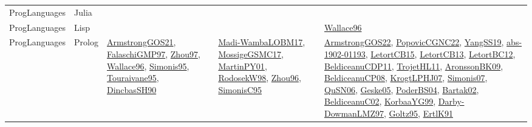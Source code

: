 {\begin{longtable}{lp{3cm}>{\raggedright}p{6cm}>{\raggedright}p{6cm}p{8cm}}
ProgLanguages & Julia &  &  & \\
ProgLanguages & Lisp &  &  & \href{articles/Wallace96.pdf}{Wallace96}\cite{Wallace96}\\
ProgLanguages & Prolog & \href{papers/ArmstrongGOS21.pdf}{ArmstrongGOS21}\cite{ArmstrongGOS21}, \href{articles/FalaschiGMP97.pdf}{FalaschiGMP97}\cite{FalaschiGMP97}, \href{articles/Zhou97.pdf}{Zhou97}\cite{Zhou97}, \href{articles/Wallace96.pdf}{Wallace96}\cite{Wallace96}, \href{papers/Simonis95.pdf}{Simonis95}\cite{Simonis95}, \href{papers/Touraivane95.pdf}{Touraivane95}\cite{Touraivane95}, \href{articles/DincbasSH90.pdf}{DincbasSH90}\cite{DincbasSH90} & \href{papers/Madi-WambaLOBM17.pdf}{Madi-WambaLOBM17}\cite{Madi-WambaLOBM17}, \href{papers/MossigeGSMC17.pdf}{MossigeGSMC17}\cite{MossigeGSMC17}, \href{articles/MartinPY01.pdf}{MartinPY01}\cite{MartinPY01}, \href{papers/RodosekW98.pdf}{RodosekW98}\cite{RodosekW98}, \href{papers/Zhou96.pdf}{Zhou96}\cite{Zhou96}, \href{papers/SimonisC95.pdf}{SimonisC95}\cite{SimonisC95} & \href{papers/ArmstrongGOS22.pdf}{ArmstrongGOS22}\cite{ArmstrongGOS22}, \href{papers/PopovicCGNC22.pdf}{PopovicCGNC22}\cite{PopovicCGNC22}, \href{papers/YangSS19.pdf}{YangSS19}\cite{YangSS19}, \href{articles/abs-1902-01193.pdf}{abs-1902-01193}\cite{abs-1902-01193}, \href{articles/LetortCB15.pdf}{LetortCB15}\cite{LetortCB15}, \href{papers/LetortCB13.pdf}{LetortCB13}\cite{LetortCB13}, \href{papers/LetortBC12.pdf}{LetortBC12}\cite{LetortBC12}, \href{articles/BeldiceanuCDP11.pdf}{BeldiceanuCDP11}\cite{BeldiceanuCDP11}, \href{articles/TrojetHL11.pdf}{TrojetHL11}\cite{TrojetHL11}, \href{papers/AronssonBK09.pdf}{AronssonBK09}\cite{AronssonBK09}, \href{papers/BeldiceanuCP08.pdf}{BeldiceanuCP08}\cite{BeldiceanuCP08}, \href{papers/KrogtLPHJ07.pdf}{KrogtLPHJ07}\cite{KrogtLPHJ07}, \href{articles/Simonis07.pdf}{Simonis07}\cite{Simonis07}, \href{papers/QuSN06.pdf}{QuSN06}\cite{QuSN06}, \href{papers/Geske05.pdf}{Geske05}\cite{Geske05}, \href{articles/PoderBS04.pdf}{PoderBS04}\cite{PoderBS04}, \href{papers/Bartak02.pdf}{Bartak02}\cite{Bartak02}, \href{papers/BeldiceanuC02.pdf}{BeldiceanuC02}\cite{BeldiceanuC02}, \href{papers/KorbaaYG99.pdf}{KorbaaYG99}\cite{KorbaaYG99}, \href{articles/Darby-DowmanLMZ97.pdf}{Darby-DowmanLMZ97}\cite{Darby-DowmanLMZ97}, \href{papers/Goltz95.pdf}{Goltz95}\cite{Goltz95}, \href{papers/ErtlK91.pdf}{ErtlK91}\cite{ErtlK91}\\

\end{longtable}}
